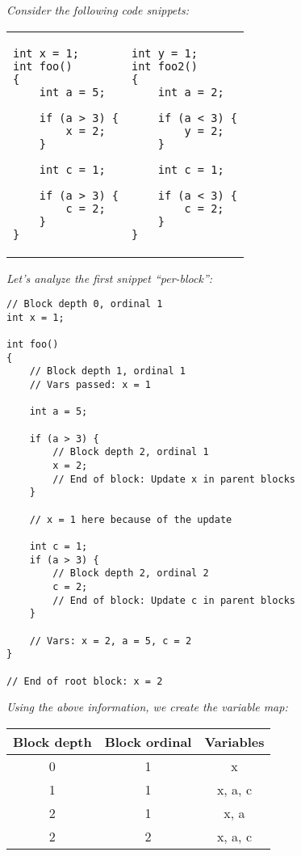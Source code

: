 \begin{exmp}
\bigskip
\textit{Consider the following code snippets:}

\begin{tabular}{ p{4.5cm} p{4.5cm} }
\begin{lstlisting}
int x = 1;
int foo()
{
    int a = 5;

    if (a > 3) {
        x = 2;
    }

    int c = 1;

    if (a > 3) {
        c = 2;
    }
}
\end{lstlisting}
&
\begin{lstlisting}
int y = 1;
int foo2()
{
    int a = 2;

    if (a < 3) {
        y = 2;
    }

    int c = 1;

    if (a < 3) {
        c = 2;
    }
}
\end{lstlisting}
\end{tabular}

\bigskip
\textit{Let's analyze the first snippet ``per-block'':}
\bigskip

\begin{lstlisting}
// Block depth 0, ordinal 1
int x = 1;

int foo()
{
    // Block depth 1, ordinal 1
    // Vars passed: x = 1

    int a = 5;

    if (a > 3) {
        // Block depth 2, ordinal 1
        x = 2;
        // End of block: Update x in parent blocks
    }

    // x = 1 here because of the update

    int c = 1;
    if (a > 3) {
        // Block depth 2, ordinal 2
        c = 2;
        // End of block: Update c in parent blocks
    }

    // Vars: x = 2, a = 5, c = 2
}

// End of root block: x = 2
\end{lstlisting}

\bigskip
\textit{Using the above information, we create the variable map:}
\bigskip

\begin{table}[H]
\centering
\begin{tabular}{ | c | c | c |}
    \hline
    Block depth & Block ordinal & Variables \\
    \hline
    0 & 1 & x \\
    1 & 1 & x, a, c \\
    2 & 1 & x, a \\
    2 & 2 & x, a, c \\
    \hline
\end{tabular}
\end{table}


\end{exmp}
